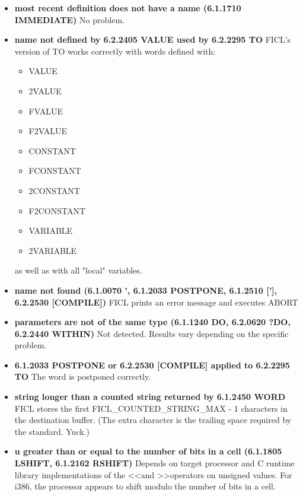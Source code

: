 \begin{itemize}[noitemsep]
	\item \textbf{most recent definition does not have a name
		(6.1.1710 IMMEDIATE)}\newline
	No problem.

	\item \textbf{name not defined by 6.2.2405 VALUE used by
		6.2.2295 TO}\newline
	FICL's version of TO works correctly with words defined with:
	\begin{itemize}[noitemsep]
		\item VALUE
		\item 2VALUE
		\item FVALUE
		\item F2VALUE
		\item CONSTANT
		\item FCONSTANT
		\item 2CONSTANT
		\item F2CONSTANT
		\item VARIABLE
		\item 2VARIABLE
	\end{itemize}
	as well as with all "local" variables.

	\item \textbf{name not found (6.1.0070 ', 6.1.2033 POSTPONE,
		6.1.2510 ['], 6.2.2530 [COMPILE])}\newline
	FICL prints an error message and executes ABORT

	\item \textbf{parameters are not of the same type (6.1.1240 DO,
		6.2.0620 ?DO, 6.2.2440 WITHIN)}\newline
	Not detected. Results vary depending on the specific problem.

	\item \textbf{6.1.2033 POSTPONE or 6.2.2530 [COMPILE] applied to
		6.2.2295 TO}\newline
	The word is postponed correctly.

	\item \textbf{string longer than a counted string returned by
		6.1.2450 WORD}\newline
	FICL stores the first FICL\_COUNTED\_STRING\_MAX - 1 characters
	in the destination buffer. (The extra character is the trailing
	space required by the standard. Yuck.)

	\item \textbf{u greater than or equal to the number of bits in a
		cell (6.1.1805 LSHIFT, 6.1.2162 RSHIFT)}\newline
	Depends on target processor and C runtime library
	implementations of the \textless\textless and
	\textgreater\textgreater operators on unsigned values. For i386,
	the processor appears to shift modulo the number of bits in a cell.


\end{itemize}

